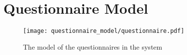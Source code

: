 
\section{Questionnaire Model}
\label{sec:questionnaire_model}

\begin{figure}[!htbp]
	\centering
	\texttt{[image: questionnaire\_model/questionnaire.pdf]}
	\caption{The model of the questionnaires in the system}
	\label{fig:questionnaire_model}
\end{figure}
\FloatBarrier
